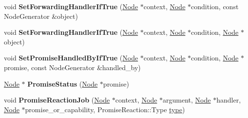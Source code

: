 \begin{DoxyCompactItemize}
\item 
\mbox{\label{classv8_1_1internal_1_1PromiseBuiltinsAssembler_a1ac07b06bb2991a7973f4fe7d6c3d7b6}} 
void {\bfseries Set\+Forwarding\+Handler\+If\+True} (\mbox{\hyperlink{classv8_1_1internal_1_1compiler_1_1Node}{Node}} $\ast$context, \mbox{\hyperlink{classv8_1_1internal_1_1compiler_1_1Node}{Node}} $\ast$condition, const Node\+Generator \&object)
\item 
\mbox{\label{classv8_1_1internal_1_1PromiseBuiltinsAssembler_a46ff94a74e6628712dc21a0ec435878a}} 
void {\bfseries Set\+Forwarding\+Handler\+If\+True} (\mbox{\hyperlink{classv8_1_1internal_1_1compiler_1_1Node}{Node}} $\ast$context, \mbox{\hyperlink{classv8_1_1internal_1_1compiler_1_1Node}{Node}} $\ast$condition, \mbox{\hyperlink{classv8_1_1internal_1_1compiler_1_1Node}{Node}} $\ast$object)
\item 
\mbox{\label{classv8_1_1internal_1_1PromiseBuiltinsAssembler_ad926b9de85cf18f7fc8c66affabcbfc5}} 
void {\bfseries Set\+Promise\+Handled\+By\+If\+True} (\mbox{\hyperlink{classv8_1_1internal_1_1compiler_1_1Node}{Node}} $\ast$context, \mbox{\hyperlink{classv8_1_1internal_1_1compiler_1_1Node}{Node}} $\ast$condition, \mbox{\hyperlink{classv8_1_1internal_1_1compiler_1_1Node}{Node}} $\ast$promise, const Node\+Generator \&handled\+\_\+by)
\item 
\mbox{\label{classv8_1_1internal_1_1PromiseBuiltinsAssembler_a1d753e3fa87ee05fd5b7893474d69fb7}} 
\mbox{\hyperlink{classv8_1_1internal_1_1compiler_1_1Node}{Node}} $\ast$ {\bfseries Promise\+Status} (\mbox{\hyperlink{classv8_1_1internal_1_1compiler_1_1Node}{Node}} $\ast$promise)
\item 
\mbox{\label{classv8_1_1internal_1_1PromiseBuiltinsAssembler_a45c24ad9bfb359dc5ad8d34af854b1de}} 
void {\bfseries Promise\+Reaction\+Job} (\mbox{\hyperlink{classv8_1_1internal_1_1compiler_1_1Node}{Node}} $\ast$context, \mbox{\hyperlink{classv8_1_1internal_1_1compiler_1_1Node}{Node}} $\ast$argument, \mbox{\hyperlink{classv8_1_1internal_1_1compiler_1_1Node}{Node}} $\ast$handler, \mbox{\hyperlink{classv8_1_1internal_1_1compiler_1_1Node}{Node}} $\ast$promise\+\_\+or\+\_\+capability, Promise\+Reaction\+::\+Type \mbox{\hyperlink{classstd_1_1conditional_1_1type}{type}})

\end{DoxyCompactItemize}
